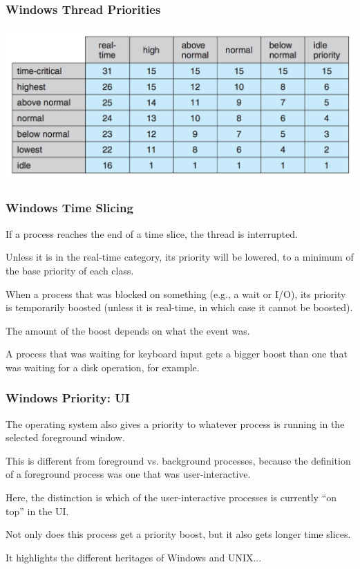 \begin{frame}
\frametitle{Windows Thread Priorities}

\begin{center}
	\includegraphics[width=\textwidth]{images/windows-thread-priorities.png}
\end{center}

\end{frame}

\begin{frame}
\frametitle{Windows Time Slicing}

If a process reaches the end of a time slice, the thread is interrupted.

Unless it is in the real-time category, its priority will be lowered, to a minimum of the base priority of each class. 

When a process that was blocked on something (e.g., a wait or I/O), its priority is temporarily boosted (unless it is real-time, in which case it cannot be boosted). 

The amount of the boost depends on what the event was.

A process that was waiting for keyboard input gets a bigger boost than one that was waiting for a disk operation, for example.

\end{frame}

\begin{frame}
\frametitle{Windows Priority: UI}

The operating system also gives a priority to whatever process is running in the selected foreground window. 

This is different from foreground vs. background processes, because the definition of a foreground process was one that was user-interactive. 

Here, the distinction is which of the user-interactive processes is currently ``on top'' in the UI. 

Not only does this process get a priority boost, but it also gets longer time slices. 

It highlights the different heritages of Windows and UNIX...

\end{frame}





